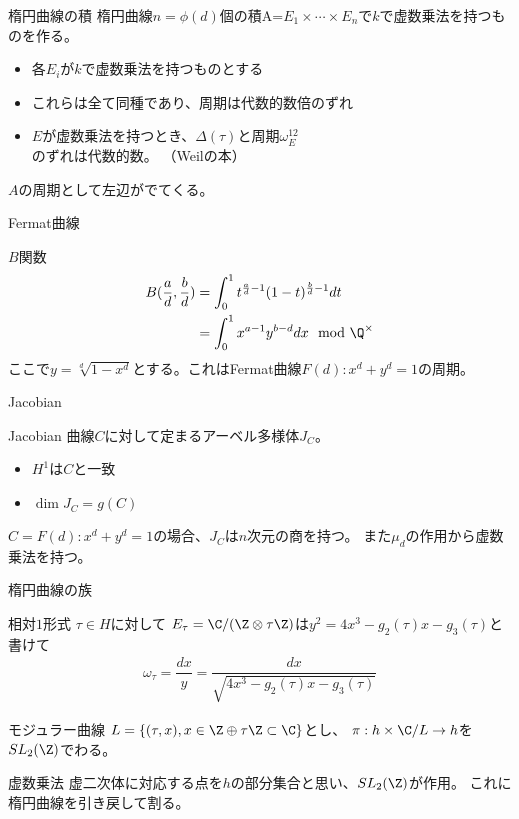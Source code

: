 \documentclass[dvipdfmx,aspectratio=169]{beamer}
\begin{document}
\begin{frame}{楕円曲線の積}
楕円曲線$n=\phi(d)$個の積A=$E_1\times\cdots\times E_n$で$k$で虚数乗法を持つものを作る。

\begin{itemize}
\item 各$E_i$が$k$で虚数乗法を持つものとする
\item これらは全て同種であり、周期は代数的数倍のずれ
\item $E$が虚数乗法を持つとき、$\Delta(\tau)$と周期$\omega_E^{12}$のずれは代数的数。
（Weilの本）
\end{itemize}

$A$の周期として左辺がでてくる。
\end{frame}

\begin{frame}{Fermat曲線}
\begin{block}{$B$関数}
\begin{align*}
B(\frac{a}{d},\frac{b}{d})
&=\int^1_0t^{\frac{a}{d}-1}(1-t)^{\frac{b}{d}-1}dt\\
&=\int^1_0x^{a-1}y^{b-d}dx \mod \Q^\times
\end{align*}
ここで$y=\sqrt[d]{1-x^d}$とする。これはFermat曲線$F(d):x^d+y^d=1$の周期。
\end{block}
\end{frame}

\begin{frame}{Jacobian}
\begin{block}{Jacobian}
曲線$C$に対して定まるアーベル多様体$J_C$。
\begin{itemize}
\item $H^1$は$C$と一致
\item $\dim J_C=g(C)$
\end{itemize}
\end{block}
$C=F(d):x^d+y^d=1$の場合、$J_C$は$n$次元の商を持つ。
また$\mu_d$の作用から虚数乗法を持つ。
\end{frame}

\begin{frame}{楕円曲線の族}
\begin{block}{相対$1$形式}
$\tau\in H$に対して
$E_\tau=\C/(\Z\otimes\tau\Z)$は$y^2=4x^3-g_2(\tau)x-g_3(\tau)$と書けて
\begin{align*}
\omega_\tau=\dfrac{dx}{y}=\dfrac{dx}{\sqrt{4x^3-g_2(\tau)x-g_3(\tau)}}
\end{align*}
\end{block}

\begin{block}{モジュラー曲線}
$L=\{(\tau, x), x \in \Z \oplus \tau\Z \subset \C\}$とし、
$\pi:h\times \C/L \to h$を$SL_2(\Z)$でわる。
\end{block}

\begin{block}{虚数乗法}
虚二次体に対応する点を$h$の部分集合と思い、$SL_2(\Z)$が作用。
これに楕円曲線を引き戻して割る。
\end{block}
\end{frame}
\end{document}
